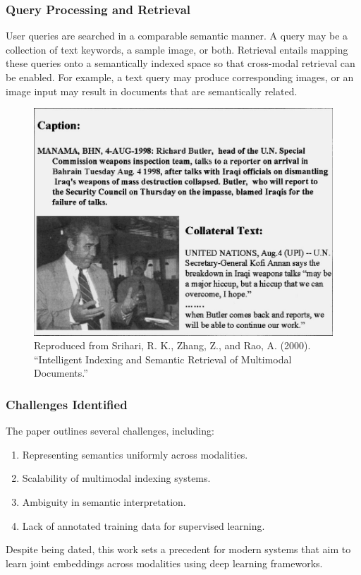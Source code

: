 \documentclass[conference]{IEEEtran}
\begin{document}
\subsubsection{Query Processing and Retrieval}
User queries are searched in a comparable semantic manner. A query may be a collection of text keywords, a sample image, or both. Retrieval entails mapping these queries onto a semantically indexed space so that cross-modal retrieval can be enabled. For example, a text query may produce corresponding images, or an image input may result in documents that are semantically related.

\begin{figure}
    \centering
    \includegraphics[width=0.7\linewidth]{images/image4.png}
    \caption{Reproduced from Srihari, R. K., Zhang, Z., and Rao, A. (2000). “Intelligent Indexing and Semantic Retrieval of Multimodal Documents.”}
    \label{fig:enter-label}
\end{figure}

\subsubsection{Challenges Identified}
The paper outlines several challenges, including:
\begin{enumerate}
    \item Representing semantics uniformly across modalities.
    \item Scalability of multimodal indexing systems.
    \item Ambiguity in semantic interpretation.
    \item Lack of annotated training data for supervised learning.
\end{enumerate}

Despite being dated, this work sets a precedent for modern systems that aim to learn joint embeddings across modalities using deep learning frameworks.
\end{document}
